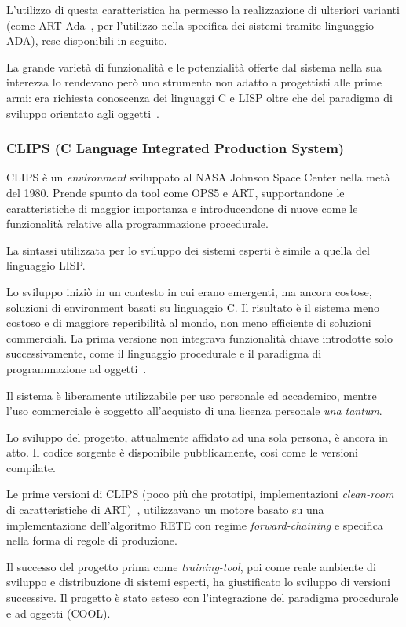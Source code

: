 L'utilizzo di questa caratteristica ha permesso la realizzazione di ulteriori varianti (come ART-Ada~\cite{artadanasa1990}, per l'utilizzo nella specifica dei sistemi tramite linguaggio ADA), rese disponibili in seguito.

La grande varietà di funzionalità e le potenzialità offerte dal sistema nella sua interezza lo rendevano però uno strumento non adatto a progettisti alle prime armi: era richiesta conoscenza dei linguaggi C e LISP oltre che del paradigma di sviluppo orientato agli oggetti~\cite{development1993}.

\subsubsection[CLIPS]{CLIPS (C Language Integrated Production System)}

CLIPS è un \emph{environment} sviluppato al NASA Johnson Space Center nella metà del 1980. Prende spunto da tool come OPS5 e ART, supportandone le caratteristiche di maggior importanza e introducendone di nuove come le funzionalità relative alla programmazione procedurale. 

La sintassi utilizzata per lo sviluppo dei sistemi esperti è simile a quella del linguaggio LISP. 

Lo sviluppo iniziò in un contesto in cui erano emergenti, ma ancora costose, soluzioni di environment basati su linguaggio C. Il risultato è il sistema meno costoso e di maggiore reperibilità al mondo, non meno efficiente di soluzioni commerciali. La prima versione non integrava funzionalità chiave introdotte solo successivamente, come il linguaggio procedurale e il paradigma di programmazione ad oggetti~\cite{jackson1999}.

Il sistema è liberamente utilizzabile per uso personale ed accademico, mentre l'uso commerciale è soggetto all'acquisto di una licenza personale \emph{una tantum}.

Lo sviluppo del progetto, attualmente affidato ad una sola persona, è ancora in atto. Il codice sorgente è disponibile pubblicamente, cosi come le versioni compilate.

Le prime versioni di CLIPS (poco più che prototipi, implementazioni \emph{clean-room} di caratteristiche di ART)~\cite{clipsarch1992}, utilizzavano un motore basato su una implementazione dell'algoritmo RETE con regime \emph{forward-chaining} e specifica nella forma di regole di produzione. 

Il successo del progetto prima come \emph{training-tool}, poi come reale ambiente di sviluppo e distribuzione di sistemi esperti, ha giustificato lo sviluppo di versioni successive. Il progetto è stato esteso con l'integrazione del paradigma procedurale e ad oggetti (COOL).

